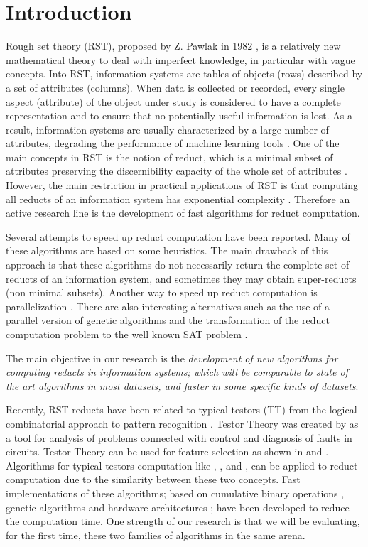 \documentclass[authoryear,11pt]{elsarticle}
\begin{document}
\section{Introduction}
  Rough set theory (RST), proposed by Z. Pawlak in 1982 \citep{Pawlak81,Pawlak81-2,Pawlak82,Pawlak91}, is a relatively new mathematical theory to deal with imperfect knowledge, in particular with vague concepts. Into RST, information systems are tables of objects (rows) described by a set of attributes (columns). When data is collected or recorded, every single aspect (attribute) of the object under study is considered to have a complete representation and to ensure that no potentially useful information is lost. As a result, information systems are usually characterized by a large number of attributes, degrading the performance of machine learning tools \citep{Parthalain08}. One of the main concepts in RST is the notion of reduct, which is a minimal subset of attributes preserving the discernibility capacity of the whole set of attributes \citep{Pawlak91}. However, the main restriction in practical applications of RST is that computing all reducts of an information system has exponential complexity \citep{Skowron92}. Therefore an active research line is the development of fast algorithms for reduct computation.
  
  Several attempts to speed up reduct computation have been reported. Many of these algorithms are based on some heuristics. The main drawback of this approach is that these algorithms do not necessarily return the complete set of reducts of an information system, and sometimes they may obtain super-reducts (non minimal subsets). Another way to speed up reduct computation is parallelization \citep{Strakowski08}. There are also interesting alternatives such as the use of a parallel version of genetic algorithms \citep{Wroblewski98} and the transformation of the reduct computation problem to the well known SAT problem \citep{Jensen14}.  
  
  The main objective in our research is the \emph{development of new algorithms for computing reducts in  	information systems; which will be comparable to state of the art algorithms in most datasets, and faster in some specific kinds of datasets}. 
  
  Recently, RST reducts have been related to typical testors (TT) from the logical combinatorial approach   to pattern recognition \citep{Lazo15}. Testor Theory was created by \cite{Cheguis55} as a tool for analysis of problems connected with control and diagnosis of faults in circuits. Testor Theory can be used for feature selection as shown in \citep{Ruiz08} and \citep{Martinez01}. Algorithms for typical testors computation like \citep{Ruiz85}, \citep{Santiesteban03}, \citep{Sanchez07} and \citep{Lias09}, can be applied to reduct computation due to the similarity between these two concepts. Fast implementations of these algorithms; based on cumulative binary operations \citep{Sanchez10}, genetic   algorithms \citep{Sanchez99} and hardware architectures \citep{Rojas12}; have been developed to reduce the computation time. One strength of our research is that we will be evaluating, for the first time, these two families of algorithms in the same arena.  
  
\end{document}
